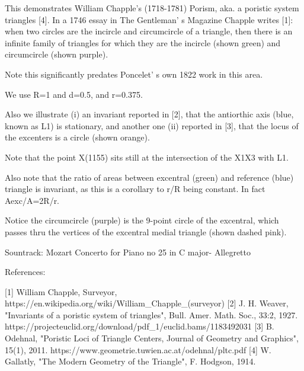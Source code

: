 This demonstrates William Chapple's (1718-1781) Porism, aka. a poristic system triangles [4]. In a 1746 essay in The Gentleman' s Magazine Chapple writes [1]: when two circles are the incircle and circumcircle of a triangle, then there is an infinite family of triangles for which they are the incircle (shown green) and circumcircle (shown purple).

Note this significantly predates Poncelet' s own 1822 work in this area.

We use R=1 and d=0.5, and r=0.375. 

Also we illustrate (i) an invariant reported in [2], that the antiorthic axis (blue, known as L1) is stationary, and another one (ii) reported in [3], that the locus of the excenters is a circle (shown orange).

Note that the point X(1155) sits still at the intersection of the X1X3 with L1.

Also note that the ratio of areas between excentral (green) and reference (blue) triangle is invariant, as this is a corollary to r/R being constant. In fact Aexc/A=2R/r.

Notice the circumcircle (purple) is the 9-point circle of the excentral, which passes thru the vertices of the excentral medial triangle (shown dashed pink).

Sountrack: Mozart Concerto for Piano no 25 in C major- Allegretto

References:

[1] William Chapple, Surveyor, https://en.wikipedia.org/wiki/William_Chapple_(surveyor)
[2] J. H. Weaver, "Invariants of a poristic system of triangles", Bull. Amer. Math. Soc., 33:2, 1927. https://projecteuclid.org/download/pdf_1/euclid.bams/1183492031
[3] B. Odehnal, "Poristic Loci of Triangle Centers, Journal of Geometry and Graphics", 15(1), 2011. https://www.geometrie.tuwien.ac.at/odehnal/pltc.pdf
[4] W. Gallatly, "The Modern Geometry of the Triangle", F. Hodgson, 1914.